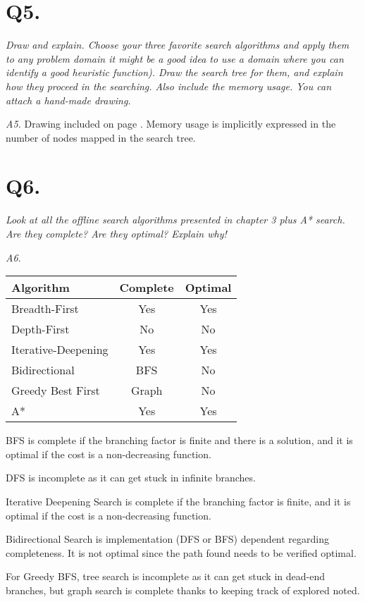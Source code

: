 \section{Q5.}
\em Draw and explain. Choose your three favorite search algorithms and apply them to any problem domain
    it might be a good idea to use a domain where you can identify a good heuristic function). Draw the
    search tree for them, and explain how they proceed in the searching. Also include the memory usage.
    You can attach a hand-made drawing.\em

    \emph{A5.} Drawing included on page \pageref{fig:a51}. Memory usage is implicitly expressed in the number
    of nodes mapped in the search tree.
     

\section{Q6.}
\em Look at all the offline search algorithms presented in chapter 3 plus A* search. Are they complete?
    Are they optimal? Explain why!\em

    \emph{A6.}
    
    \begin{tabular}{l|c|c}
      Algorithm & Complete & Optimal \\
      \hline
      Breadth-First & Yes & Yes \\
      Depth-First & No & No\\
      Iterative-Deepening & Yes & Yes\\
      Bidirectional & BFS & No\\
      Greedy Best First & Graph & No\\
      A* & Yes & Yes      
    \end{tabular}

    BFS is complete if the branching factor is finite and there is a solution, and it is optimal if the cost
    is a non-decreasing function.

    DFS is incomplete as it can get stuck in infinite branches.

    Iterative Deepening Search is complete if the branching factor is finite, and it is optimal if the cost is
    a non-decreasing function.

    Bidirectional Search is implementation (DFS or BFS) dependent regarding completeness. It is not optimal
    since the path found needs to be verified optimal.

    For Greedy BFS, tree search is incomplete as it can get stuck in dead-end branches, but graph search is
    complete thanks to keeping track of explored noted.

